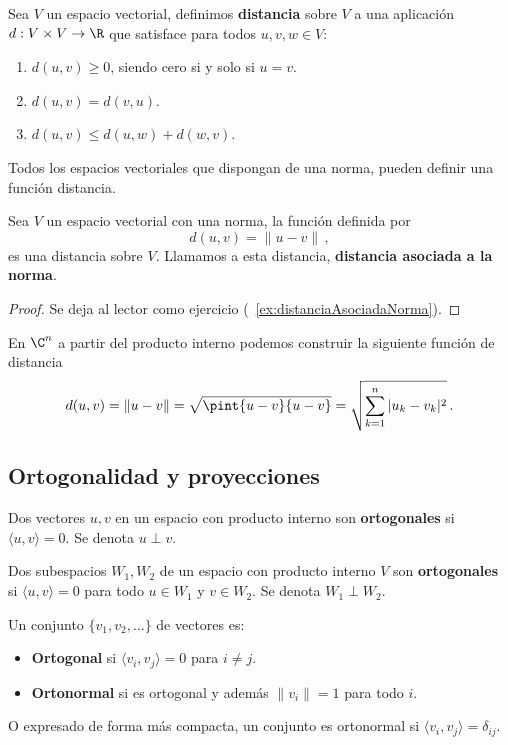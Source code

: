 \begin{defi}[Distancia]
  Sea $V$ un espacio vectorial, definimos \textbf{distancia} sobre $V$ a una aplicación $d: V \times V \to \R$ que satisface para todos $u, v, w \in V$:
  \begin{enumerate}
    \item $d(u, v) \geq 0$, siendo cero si y solo si $u=v$.
    \item $d(u, v) = d(v, u)$.
    \item $d(u, v) \leq d(u, w) + d(w, v)$.
  \end{enumerate}

\end{defi}

Todos los espacios vectoriales que dispongan de una norma, pueden definir una función distancia.

\begin{prop}
  \label{prop:distanciaAsociadaNorma}
  Sea $V$ un espacio vectorial con una norma, la función definida por
  \[
    d(u, v) = \| u - v \|\,,
  \]
  es una distancia sobre $V$. Llamamos a esta distancia, \textbf{distancia asociada a la norma}.
\end{prop}

\begin{proof}
  Se deja al lector como ejercicio (~\ref{ex:distanciaAsociadaNorma}).
\end{proof}

\begin{eje}
  En $\C^n$ a partir del producto interno podemos construir la siguiente función de distancia
  \[
    d(u, v) = \|u-v\| = \sqrt{\pint{u-v}{u-v}} = \sqrt{\sum_{k=1}^n  |u_k - v_k|^2}\,.
  \]
\end{eje}

\subsection{Ortogonalidad y proyecciones}

\begin{defi}[Ortogonalidad]
  Dos vectores $u, v$ en un espacio con producto interno son \textbf{ortogonales} si $\langle u, v \rangle = 0$. Se denota $u \perp v$.

  Dos subespacios $W_1, W_2$ de un espacio con producto interno $V$ son \textbf{ortogonales} si $\langle u, v \rangle = 0$ para todo $u \in W_1$ y $v \in W_2$. Se denota $W_1 \perp W_2$.
\end{defi}

\begin{defi}
  Un conjunto $\{v_1, v_2, \ldots\}$ de vectores es:
  \begin{itemize}
    \item \textbf{Ortogonal} si $\langle v_i, v_j \rangle = 0$ para $i \neq j$.
    \item \textbf{Ortonormal} si es ortogonal y además $\|v_i\| = 1$ para todo $i$.
  \end{itemize}

  O expresado de forma más compacta, un conjunto es ortonormal si $\langle v_i, v_j \rangle = \delta_{ij}$.
\end{defi}

